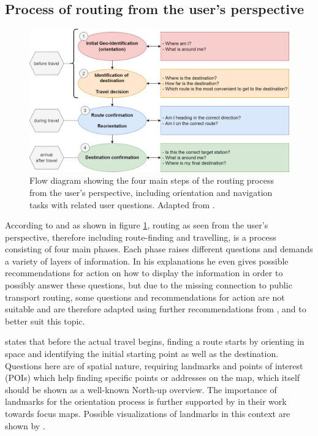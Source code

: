 \documentclass[agile, final]{copernicus-agile}
\begin{document}
\subsection{Process of routing from the user's perspective}

\begin{figure}[ht]
\includegraphics[width=\textwidth]{figures/route finding process.png}
\caption{Flow diagram showing the four main steps of the routing process from the user's perspective, including orientation and navigation tasks with related user questions. Adapted from \citet{Delikostidis2011}.}
\label{pic:route finding process}
\end{figure}

According to \citet{Delikostidis2011} and as shown in figure \ref{pic:route finding process}, routing as seen from the user's perspective, therefore including route-finding and travelling, is a process consisting of four main phases. Each phase raises different questions and demands a variety of layers of information. In his explanations he even gives possible recommendations for action on how to display the information in order to possibly answer these questions, but due to the missing connection to public transport routing, some questions and recommendations for action are not suitable and are therefore adapted using further recommendations from \citet{Agrawala2002}, \citet{Zipf2002} and \citet{ZipfNeis2007} to better suit this topic.

\citet{Delikostidis2011} states that before the actual travel begins, finding a route starts by orienting in space and identifying the initial starting point as well as the destination. Questions here are of spatial nature, requiring landmarks and points of interest (POIs) which help finding specific points or addresses on the map, which itself should be shown as a well-known North-up overview. The importance of landmarks for the orientation process is further supported by \citet{ZipfNeis2007} in their work towards focus maps. Possible visualizations of landmarks in this context are shown by \citet{EliasEA2005}.
\end{document}
